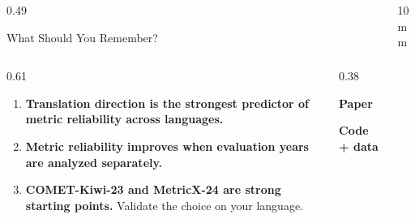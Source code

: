 \documentclass[final]{beamer}
\newlength{\contentwidth}
\begin{document}
\begin{frame}[t]{}
\begin{columns}[t,totalwidth=\paperwidth]
\begin{column}{0.49\contentwidth}
\begin{sectionbox}{What Should You Remember?}
\begin{columns}[c,totalwidth=\linewidth]
\begin{column}{0.61\linewidth}
\begin{enumerate}
  \item \textbf{Translation direction is the strongest predictor of metric
        reliability across languages.}
  \item \textbf{Metric reliability improves when evaluation years are analyzed
        separately.}
  \item \textbf{COMET-Kiwi-23 and MetricX-24 are strong starting points.}
        Validate the choice on your language.
\end{enumerate}
\end{column}
\begin{column}{0.38\linewidth}
\centering
\begin{minipage}[c]{0.47\linewidth}\centering
  \textbf{Paper}\\[0.25em]
\end{minipage}\hfill
\begin{minipage}[c]{0.47\linewidth}\centering
  \textbf{Code + data}\\[0.25em]
\end{minipage}
\end{column}
\end{columns}
\end{sectionbox}

\end{column}
\begin{column}{10mm}\end{column}
\end{columns}

\end{frame}
\end{document}
